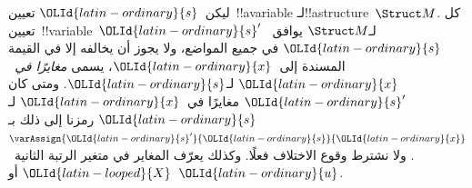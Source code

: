 \documentclass[../../../include/open-logic-section]{subfiles}
\begin{document}
\begin{defn}
ليكن~$\OLId{latin-ordinary}{s}$ تعيين~!!a{variable} لـ!!a{structure}~$\Struct M$.
كل تعيين~!!{variable}~$\OLId{latin-ordinary}{s}'$ لـ$\Struct M$ يوافق~$\OLId{latin-ordinary}{s}$ في جميع
المواضع، ولا يجوز أن يخالفه إلا في القيمة المسندة إلى~$\OLId{latin-ordinary}{x}$، يسمى
\emph{مغايرًا في~$\OLId{latin-ordinary}{x}$} لـ$\OLId{latin-ordinary}{s}$. ومتى كان
$\OLId{latin-ordinary}{s}'$ مغايرًا في~$\OLId{latin-ordinary}{x}$ لـ$\OLId{latin-ordinary}{s}$ رمزنا إلى ذلك
بـ$\varAssign{\OLId{latin-ordinary}{s}'}{\OLId{latin-ordinary}{s}}{\OLId{latin-ordinary}{x}}$. ولا نشترط وقوع الاختلاف فعلًا.
وكذلك يعرّف المغاير في متغير الرتبة الثانية~$\OLId{latin-looped}{X}$ أو~$\OLId{latin-ordinary}{u}$.
\end{defn}
\end{document}
